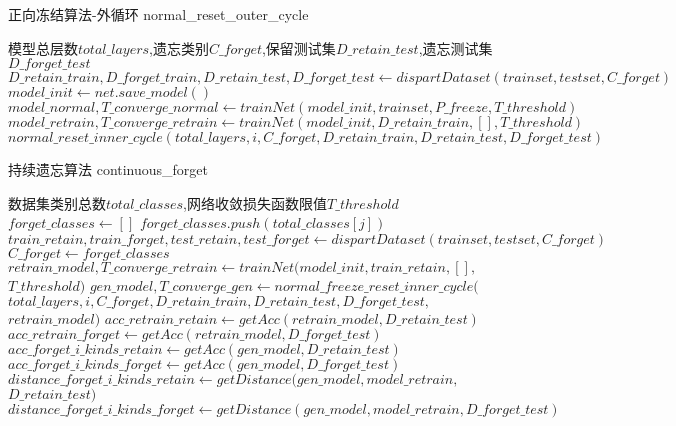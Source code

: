 \begin{algorithm}
	\renewcommand{\algorithmicrequire}{\textbf{Input:}}
	\renewcommand{\algorithmicensure}{\textbf{Output:}}
	\caption{正向冻结算法-外循环 normal\_reset\_outer\_cycle}
	\label{algorithm:normal_reset_outer_cycle}
	\begin{algorithmic}[1]
        \REQUIRE 模型总层数$total\_layers$,遗忘类别$C\_forget$,保留测试集$D\_retain\_test$,遗忘测试集$D\_forget\_test$
        \ENSURE  
        \STATE $D\_retain\_train, D\_forget\_train, D\_retain\_test, D\_forget\_test \gets dispartDataset(trainset, testset, C\_forget)$
        \STATE $model\_init \gets net.save\_model()$
        \STATE $model\_normal,T\_converge\_normal \gets trainNet(model\_init, trainset, P\_freeze, T\_threshold)$
        \STATE $model\_retrain,T\_converge\_retrain \gets trainNet(model\_init, D\_retain\_train, [], T\_threshold)$
            \STATE $normal\_reset\_inner\_cycle(total\_layers, i, C\_forget, D\_retain\_train, D\_retain\_test, D\_forget\_test)$
        \ENDFOR
	\end{algorithmic}  
\end{algorithm}

\begin{algorithm}
	\renewcommand{\algorithmicrequire}{\textbf{Input:}}
	\renewcommand{\algorithmicensure}{\textbf{Output:}}
	\caption{持续遗忘算法 continuous\_forget}
	\label{algorithm:continuous_forget}
	\begin{algorithmic}[1]
        \REQUIRE 数据集类别总数$total\_classes$,网络收敛损失函数限值$T\_threshold$
        \ENSURE  
            \STATE $forget\_classes \gets []$
                \STATE $forget\_classes.push(total\_classes[j])$
            \ENDFOR
            \STATE $train\_retain,train\_forget,test\_retain,test\_forget \gets dispartDataset(trainset, testset, C\_forget)$
            \STATE $C\_forget \gets forget\_classes$
            \STATE $retrain\_model,T\_converge\_retrain \gets trainNet(model\_init, train\_retain, [],$ \\ $ T\_threshold)$
            \STATE $gen\_model, T\_converge\_gen \gets normal\_freeze\_reset\_inner\_cycle($\\$total\_layers, i, C\_forget,D\_retain\_train,D\_retain\_test, D\_forget\_test,$\\$retrain\_model )$
            \STATE $acc\_retrain\_retain \gets getAcc(retrain\_model, D\_retain\_test)$
            \STATE $acc\_retrain\_forget  \gets getAcc(retrain\_model, D\_forget\_test)$
            \STATE $acc\_forget\_i\_kinds\_retain \gets getAcc(gen\_model, D\_retain\_test)$
            \STATE $acc\_forget\_i\_kinds\_forget  \gets getAcc(gen\_model, D\_forget\_test)$
            \STATE $distance\_forget\_i\_kinds\_retain \gets getDistance(gen\_model, model\_retrain,$\\$D\_retain\_test)$
            \STATE $distance\_forget\_i\_kinds\_forget \gets getDistance(gen\_model, model\_retrain, D\_forget\_test)$
        \ENDFOR
	\end{algorithmic}  
\end{algorithm}

